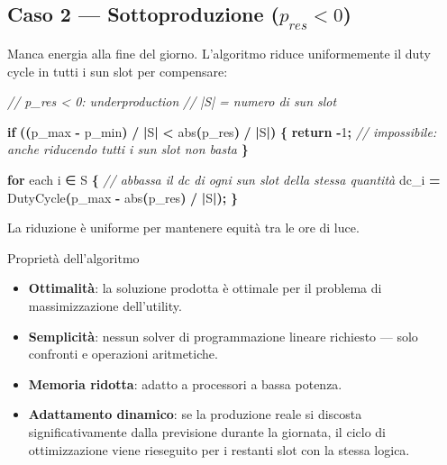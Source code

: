 \documentclass[
  italian,
  openany]{book}
\newenvironment{Shaded}{\begin{snugshade}}{\end{snugshade}}
\newcommand{\CommentTok}[1]{\textcolor[rgb]{0.56,0.35,0.01}{\textit{#1}}}
\newcommand{\ControlFlowTok}[1]{\textcolor[rgb]{0.13,0.29,0.53}{\textbf{#1}}}
\newcommand{\DecValTok}[1]{\textcolor[rgb]{0.00,0.00,0.81}{#1}}
\newcommand{\NormalTok}[1]{#1}
\newcommand{\OperatorTok}[1]{\textcolor[rgb]{0.81,0.36,0.00}{\textbf{#1}}}
\providecommand{\tightlist}{%
  \setlength{\itemsep}{0pt}\setlength{\parskip}{0pt}}
\begin{document}
\subsection{\texorpdfstring{Caso 2 --- Sottoproduzione
(\(p_{res} < 0\))}{Caso 2 --- Sottoproduzione (p\_\{res\} \textless{} 0)}}\label{caso-2-sottoproduzione-p_res-0}

Manca energia alla fine del giorno. L'algoritmo riduce uniformemente il
duty cycle in tutti i sun slot per compensare:

\begin{Shaded}
\begin{Highlighting}[]
\CommentTok{// p\_res \textless{} 0: underproduction}
\CommentTok{// |S| = numero di sun slot}

\ControlFlowTok{if} \OperatorTok{((}\NormalTok{p\_max }\OperatorTok{{-}}\NormalTok{ p\_min}\OperatorTok{)} \OperatorTok{/} \OperatorTok{|}\NormalTok{S}\OperatorTok{|} \OperatorTok{\textless{}}\NormalTok{ abs}\OperatorTok{(}\NormalTok{p\_res}\OperatorTok{)} \OperatorTok{/} \OperatorTok{|}\NormalTok{S}\OperatorTok{|)} \OperatorTok{\{}
    \ControlFlowTok{return} \OperatorTok{{-}}\DecValTok{1}\OperatorTok{;}  \CommentTok{// impossibile: anche riducendo tutti i sun slot non basta}
\OperatorTok{\}}

\ControlFlowTok{for}\NormalTok{ each i ∈ S }\OperatorTok{\{}
    \CommentTok{// abbassa il dc di ogni sun slot della stessa quantità}
\NormalTok{    dc\_i }\OperatorTok{=}\NormalTok{ DutyCycle}\OperatorTok{(}\NormalTok{p\_max }\OperatorTok{{-}}\NormalTok{ abs}\OperatorTok{(}\NormalTok{p\_res}\OperatorTok{)} \OperatorTok{/} \OperatorTok{|}\NormalTok{S}\OperatorTok{|);}
\OperatorTok{\}}
\end{Highlighting}
\end{Shaded}

La riduzione è uniforme per mantenere equità tra le ore di luce.

\begin{callouttip}{Proprietà dell’algoritmo}

\begin{itemize}
\tightlist
\item
  \textbf{Ottimalità}: la soluzione prodotta è ottimale per il problema
  di massimizzazione dell'utility.
\item
  \textbf{Semplicità}: nessun solver di programmazione lineare richiesto
  --- solo confronti e operazioni aritmetiche.
\item
  \textbf{Memoria ridotta}: adatto a processori a bassa potenza.
\item
  \textbf{Adattamento dinamico}: se la produzione reale si discosta
  significativamente dalla previsione durante la giornata, il ciclo di
  ottimizzazione viene rieseguito per i restanti slot con la stessa
  logica.
\end{itemize}

\end{callouttip}
\end{document}
